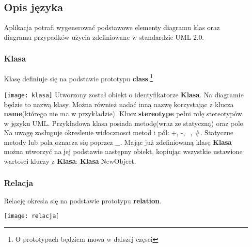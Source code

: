 \subsection{Opis języka}

Aplikacja potrafi wygenerować podstawowe elementy diagramu klas oraz diagramu przypadków użycia zdefiniowane w standardzie UML 2.0.

\subsubsection{Klasa}

Klasę definiuje się na podstawie prototypu \textbf{class}.\footnote{O prototypach będziem mowa w dalszej częsci}

    \texttt{[image: klasa]}
Utworzony został obiekt o identyfikatorze \textbf{Klasa}. Na diagramie będzie to nazwą klasy. Można również nadać inną nazwę korzystając z klucza \textbf{name}(którego nie ma w przykładzie). Klucz \textbf{stereotype} pełni rolę stereotypów w języku UML. Przykładowa klasa posiada metodę(wraz ze statyczną) oraz pole. Na uwagę zasługuje okreslenie widocznosci metod i pól: +, -, ~, \#. Statyczne metody lub pola oznacza się poprzez \_.
Mając już zdefiniowaną klasę \textbf{Klasa} można utworzyć na jej podstawie następny obiekt, kopiując wszystkie ustawione wartosci kluczy z \textbf{Klasa}: \textbf{Klasa} NewObject.

\subsubsection{Relacja}

Relację okresla się na podstawie prototypu \textbf{relation}.

\texttt{[image: relacja]}